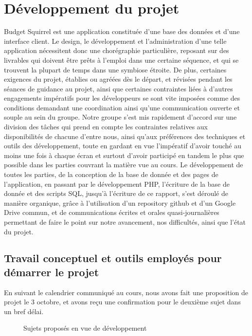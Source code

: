 \documentclass[a4paper,12pt]{article}
\begin{document}
\newpage

\section{Développement du projet}

Budget Squirrel est une application constituée d'une base des données et d'une interface client.
Le design, le développement et l'administration d'une telle application nécessitent donc une chorégraphie particulière, reposant sur des livrables qui doivent être prêts à l'emploi dans une certaine séquence, et qui se trouvent la plupart de temps dans une symbiose étroite.
De plus, certaines exigences du projet, établies ou agréées dès le départ, et révisées pendant les séances de guidance au projet, ainsi que certaines contraintes liées à d'autres engagements impératifs pour les développeurs se sont vite imposées comme des conditions demandant une coordination ainsi qu'une communication ouverte et souple au sein du groupe.
Notre groupe s'est mis rapidement d'accord sur une division des tâches qui prend en compte les contraintes relatives aux disponibilités de chacune d'entre nous, ainsi qu'aux préférences des techniques et outils des développement, toute en gardant en vue l'impératif d'avoir touché au moins une fois à chaque écran et surtout d'avoir participé en tandem le plus que possible dans les parties couvrant la matière vue au cours.
Le développement de toutes les parties, de la conception de la base de donnée et des pages de l'application, en passant par le développement PHP, l'écriture de la base de donnée et des scripts SQL, jusqu'à l'écriture de ce rapport, s'est déroulé de manière organique, grâce à l'utilisation d'un repository github et d'un Google Drive commun, et de communications écrites et orales quasi-journalières permettant de faire le point sur notre avancement, nos difficultés, ainsi que l'état du projet.

\subsection{Travail conceptuel et outils employés pour démarrer le projet}

En suivant le calendrier communiqué au cours, nous avons fait une proposition de projet le 3 octobre, et avons reçu une confirmation pour le deuxième sujet dans un bref délai.

\begin{figure}[!ht]
\noindent
{}
\caption{\footnotesize{Sujets proposés en vue de développement}}
\end{figure}
\end{document}
